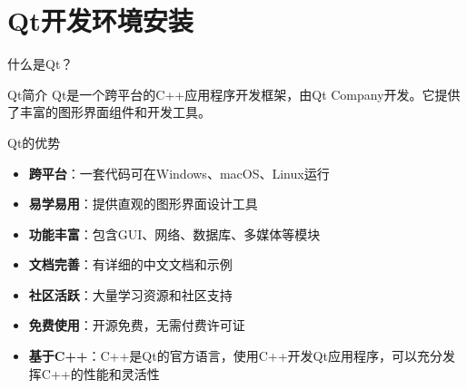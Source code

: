 \documentclass[UTF8,aspectratio=169]{beamer}
\begin{document}
\section{Qt开发环境安装}

\begin{frame}{什么是Qt？}
    \begin{ytublock}{Qt简介}
        Qt是一个跨平台的C++应用程序开发框架，由Qt Company开发。它提供了丰富的图形界面组件和开发工具。
    \end{ytublock}

    \begin{ytublock}{Qt的优势}
        \begin{itemize}
            \item \textbf{跨平台}：一套代码可在Windows、macOS、Linux运行
            \item \textbf{易学易用}：提供直观的图形界面设计工具
            \item \textbf{功能丰富}：包含GUI、网络、数据库、多媒体等模块
            \item \textbf{文档完善}：有详细的中文文档和示例
            \item \textbf{社区活跃}：大量学习资源和社区支持
            \item \textbf{免费使用}：开源免费，无需付费许可证
            \item \textbf{基于C++}：C++是Qt的官方语言，使用C++开发Qt应用程序，可以充分发挥C++的性能和灵活性
        \end{itemize}
    \end{ytublock}
\end{frame}
\end{document}
